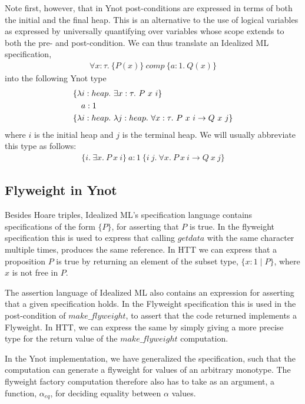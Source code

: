 Note first, however, that in Ynot post-conditions are expressed in terms of
both the initial and the final heap. This is an alternative to the use of
logical variables as expressed by universally quantifying over variables
whose scope extends to both the pre- and post-condition.  We can thus
translate an Idealized ML specification,
{\small\begin{align*}
\forall x : \tau.\ \{ P(x) \}\ comp\ \{ a : 1.\ Q(x) \}
\end{align*}}%
into the following Ynot type
{\small\begin{align*}
&\{ \lambda i : \HEAP.\ \exists x : \tau.\ P\ x\ i \}\\
&\quad a : 1\\
&\{ \lambda i : \HEAP.\ \lambda j : \HEAP.\ \forall x : \tau.\ P\ x\ i
\rightarrow Q\ x\ j \}
\end{align*}}%
where $i$ is the initial heap and $j$ is the terminal heap. We will usually
abbreviate this type as follows: 
{\small\begin{align*}
\{ i.\ \exists x.\ P\ x\ i \}\ a : 1\ \{ i\ j.\ \forall x.\ P\ x\ i \rightarrow Q\ x\ j \}
\end{align*}}

\subsection{Flyweight in Ynot}
\label{sec:ynot-flyweight}

Besides Hoare triples, Idealized ML's specification language contains
specifications of the form $\{ P \}$, for asserting that $P$ is true. In the
flyweight specification this is used to express that calling $getdata$ with the
same character multiple times, produces the same reference. In HTT we can
express that a proposition $P$ is true by returning an element of
the subset type, $\{ x : 1 \mid P \}$, where $x$ is not free in $P$. 

The assertion language of Idealized ML also contains an expression for
asserting that a given specification holds. In the Flyweight specification
this is used in the post-condition of $make\_flyweight$, to assert that the
code returned implements a Flyweight. In HTT, we can express the same by
simply giving a more precise type for the return value of the
$make\_flyweight$ computation.

In the Ynot implementation, we have generalized the specification, such that
the computation can generate a flyweight for values of an arbitrary monotype.
The flyweight factory computation therefore also has to take as an argument, a
function, $\alpha_{eq}$, for deciding equality between $\alpha$ values. 

